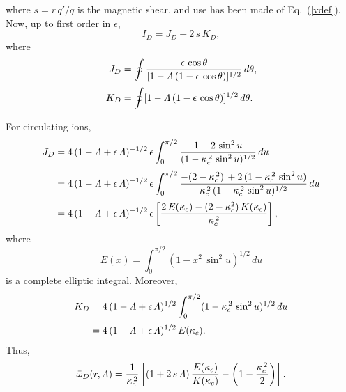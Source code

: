 \documentclass[12pt,prb,aps,notitlepage]{revtex4-1}
\begin{document}
where  $s=r\,q'/q$ is the magnetic shear, and use has been made of Eq.~(\ref{vdef}).
Now, up to first order in $\epsilon$, 
\begin{equation}
I_D= J_D+ 2\,s\,K_D,
\end{equation}
where
\begin{align}
J_D&= \oint\frac{\epsilon\,\cos\theta}{[1-{\mit\Lambda}\,(1-\epsilon\,\cos\theta)]^{1/2}}\,d\theta,\\[0.5ex]
K_D&= \oint[1-{\mit\Lambda}\,(1-\epsilon\,\cos\theta)]^{1/2}\,d\theta.
\end{align}

For circulating ions,
\begin{align}
J_D &= 4\,(1-{\mit\Lambda}+\epsilon\,{\mit\Lambda})^{-1/2}\,\epsilon\int_0^{\pi/2}\frac{1-2\,\sin^2 u}{(1-\kappa_c^{\,2}\,\sin^2 u)^{1/2}}\,du\nonumber\\[0.5ex]
&= 4\,(1-{\mit\Lambda}+\epsilon\,{\mit\Lambda})^{-1/2}\,\epsilon\int_0^{\pi/2}\frac{-(2-\kappa_c^{\,2})\,+2\,(1-\kappa_c^{\,2}\,\sin^2 u)}{\kappa_c^{\,2}\,(1-\kappa_c^{\,2}\,\sin^2 u)^{1/2}}\,du\nonumber\\[0.5ex]
&= 4\,(1-{\mit\Lambda}+\epsilon\,{\mit\Lambda})^{-1/2}\,\epsilon\left[\frac{2\,E(\kappa_c)- (2-\kappa_c^2)\,K(\kappa_c)}{\kappa_c^{\,2}}\right],
\end{align}
where 
\begin{equation}
E(x) =\int_0^{\pi/2}(1-x^2\,\sin^2 u)^{1/2}\,du
\end{equation}
is a complete elliptic integral. Moreover,
\begin{align}
K_D &= 4\,(1-{\mit\Lambda}+\epsilon\,{\mit\Lambda})^{1/2}\int_0^{\pi/2}(1-\kappa_c^{\,2}\,\sin^2 u)^{1/2}\,du\nonumber\\[0.5ex]
&= 4\,(1-{\mit\Lambda}+\epsilon\,{\mit\Lambda})^{1/2}\,E(\kappa_c).
\end{align}
Thus,
\begin{equation}
\bar{\omega}_D(r,{\mit\Lambda}) =\frac{1}{\kappa_c^{\,2}}\left[(1+2\,s\,{\mit\Lambda})\,\frac{E(\kappa_c)}{K(\kappa_c)} - \left(1-\frac{\kappa_c^{\,2}}{2}\right)\right].
\end{equation}
\end{document}
